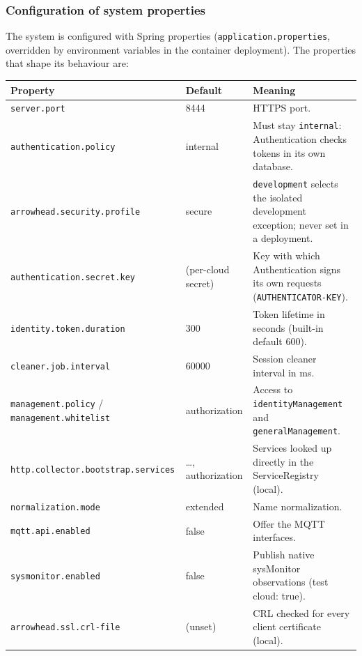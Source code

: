 \documentclass[a4paper]{arrowhead}
\begin{document}
\subsubsection{Configuration of system properties}

The system is configured with Spring properties (\texttt{application.properties}, overridden by environment variables in the container deployment). The properties that shape its behaviour are:

\noindent\begin{longtable}{| p{5.4cm} | p{3.4cm} | p{6.4cm} |} \hline
\rowcolor{gray!33} Property & Default & Meaning \\ \hline \endhead
\texttt{server.\allowbreak{}port} & 8444 & HTTPS port. \\ \hline
\texttt{authentication.\allowbreak{}policy} & internal & Must stay \texttt{internal}: Authentication checks tokens in its own database. \\ \hline
\texttt{arrowhead.\allowbreak{}security.\allowbreak{}profile} & secure & \texttt{development} selects the isolated development exception; never set in a deployment. \\ \hline
\texttt{authentication.\allowbreak{}secret.\allowbreak{}key} & (per-cloud secret) & Key with which Authentication signs its own requests (\texttt{AUTHENTICATOR-\allowbreak{}KEY}). \\ \hline
\texttt{identity.\allowbreak{}token.\allowbreak{}duration} & 300 & Token lifetime in seconds (built-in default 600). \\ \hline
\texttt{cleaner.\allowbreak{}job.\allowbreak{}interval} & 60000 & Session cleaner interval in ms. \\ \hline
\texttt{management.\allowbreak{}policy} / \texttt{management.\allowbreak{}whitelist} & authorization & Access to \texttt{identityManagement} and \texttt{generalManagement}. \\ \hline
\texttt{http.\allowbreak{}collector.\allowbreak{}bootstrap.\allowbreak{}services} & \ldots{}, authorization & Services looked up directly in the ServiceRegistry (local). \\ \hline
\texttt{normalization.\allowbreak{}mode} & extended & Name normalization. \\ \hline
\texttt{mqtt.\allowbreak{}api.\allowbreak{}enabled} & false & Offer the MQTT interfaces. \\ \hline
\texttt{sysmonitor.\allowbreak{}enabled} & false & Publish native sysMonitor observations (test cloud: true). \\ \hline
\texttt{arrowhead.\allowbreak{}ssl.\allowbreak{}crl-\allowbreak{}file} & (unset) & CRL checked for every client certificate (local). \\ \hline
\end{longtable}
\end{document}
